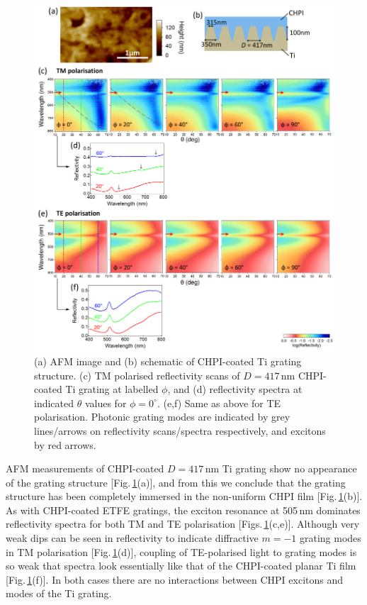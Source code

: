 \begin{figure}[ht] 
\centering    
\includegraphics[width=\textwidth]{Fig6}
\caption{(a) AFM image and (b) schematic of CHPI-coated Ti grating structure. (c) TM polarised reflectivity scans of $D=417$\,nm CHPI-coated Ti grating at labelled $\phi$, and (d) reflectivity spectra at indicated $\theta$ values for $\phi=0^{\circ}$. (e,f) Same as above for TE polarisation. Photonic grating modes are indicated by grey lines/arrows on reflectivity scans/spectra respectively, and excitons by red arrows.}
\label{7Fig6}
\end{figure}
AFM measurements of CHPI-coated $D=417$\,nm Ti grating show no appearance of the grating structure [Fig.\,\ref{7Fig6}(a)], and from this we conclude that the grating structure has been completely immersed in the non-uniform CHPI film [Fig.\,\ref{7Fig6}(b)]. As with CHPI-coated ETFE gratings, the exciton resonance at 505\,nm dominates reflectivity spectra for both TM and TE polarisation [Figs.\,\ref{7Fig6}(c,e)]. Although very weak dips can be seen in reflectivity to indicate diffractive $m=-1$ grating modes in TM polarisation [Fig.\,\ref{7Fig6}(d)], coupling of TE-polarised light to grating modes is so weak that spectra look essentially like that of the CHPI-coated planar Ti film [Fig.\,\ref{7Fig6}(f)]. In both cases there are no interactions between CHPI excitons and modes of the Ti grating.

